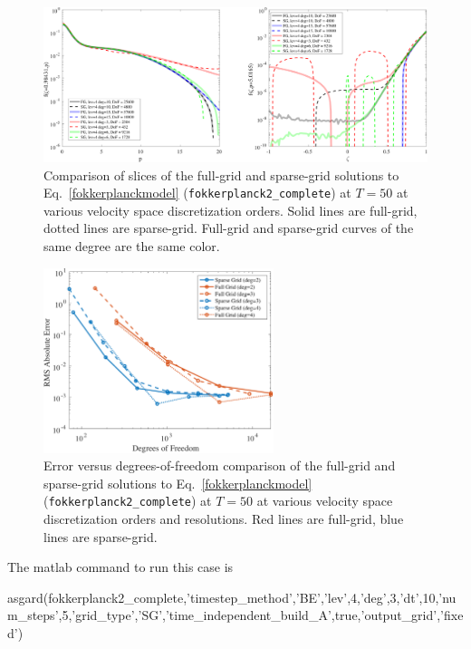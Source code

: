 \documentclass[preprint,11pt]{elsarticle}
\begin{document}
\begin{figure}
    \centering
    \includegraphics[width=1.2\textwidth]{FIGURES/asgard-2d-slice-sg.pdf}
    \caption{Comparison of slices of the full-grid and sparse-grid solutions to Eq.~\ref{fokkerplanckmodel} (\texttt{fokkerplanck2\_complete}) at $T=50$ at various velocity space discretization orders. Solid lines are full-grid, dotted lines are sparse-grid. Full-grid and sparse-grid curves of the same degree are the same color.}
    \label{fig:sg-slices}
\end{figure}
%
\begin{figure}
    \centering
    \includegraphics[width=0.6\textwidth]{FIGURES/asgard-2d-sg-error.pdf}
    \caption{Error versus degrees-of-freedom comparison of the full-grid and sparse-grid solutions to Eq.~\ref{fokkerplanckmodel} (\texttt{fokkerplanck2\_complete}) at $T=50$ at various velocity space discretization orders and resolutions. Red lines are full-grid, blue lines are sparse-grid.}
    \label{fig:sg-error}
\end{figure}
%
The matlab command to run this case is 
%
\begin{code}
asgard(fokkerplanck2_complete,'timestep_method','BE','lev',4,'deg',3,'dt',10,'num_steps',5,'grid_type','SG','time_independent_build_A',true,'output_grid','fixed')
\end{code}
%
\end{document}
